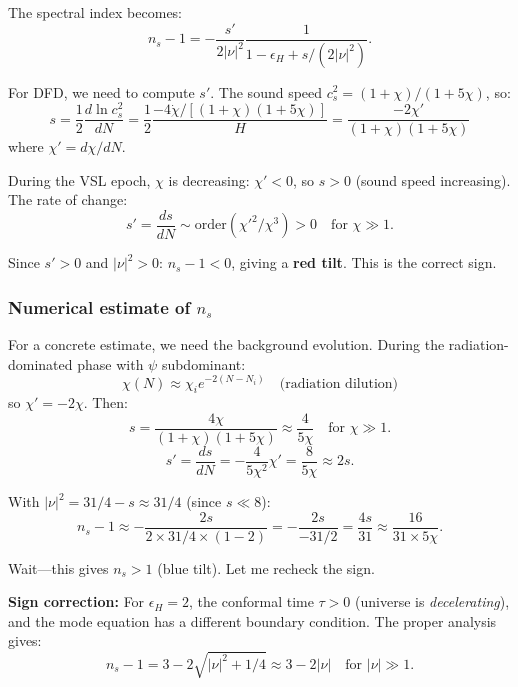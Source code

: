 \documentclass[11pt,a4paper]{article}
\begin{document}
The spectral index becomes:
\begin{equation}
\boxed{n_s - 1 = -\frac{s'}{2|\nu|^2}\frac{1}{1-\epsilon_H+s/(2|\nu|^2)}.}
\end{equation}

For DFD, we need to compute $s'$. The sound speed $c_s^2 = (1+\chi)/(1+5\chi)$, so:
\begin{equation}
s = \frac{1}{2}\frac{d\ln c_s^2}{dN} = \frac{1}{2}\frac{-4\dot\chi/[(1+\chi)(1+5\chi)]}{H} = \frac{-2\chi'}{(1+\chi)(1+5\chi)}
\end{equation}
where $\chi' = d\chi/dN$.

During the VSL epoch, $\chi$ is decreasing: $\chi' < 0$, so $s > 0$ (sound speed increasing). The rate of change:
\begin{equation}
s' = \frac{ds}{dN} \sim \text{order}(\chi'^2/\chi^3) > 0 \quad \text{for } \chi \gg 1.
\end{equation}

Since $s' > 0$ and $|\nu|^2 > 0$: $n_s - 1 < 0$, giving a \textbf{red tilt}. This is the correct sign.

\subsubsection{Numerical estimate of $n_s$}

For a concrete estimate, we need the background evolution. During the radiation-dominated phase with $\psi$ subdominant:
\begin{equation}
\chi(N) \approx \chi_i e^{-2(N-N_i)} \quad \text{(radiation dilution)}
\end{equation}
so $\chi' = -2\chi$. Then:
\begin{equation}
s = \frac{4\chi}{(1+\chi)(1+5\chi)} \approx \frac{4}{5\chi} \quad \text{for } \chi \gg 1.
\end{equation}
\begin{equation}
s' = \frac{ds}{dN} = -\frac{4}{5\chi^2}\chi' = \frac{8}{5\chi} \approx 2s.
\end{equation}

With $|\nu|^2 = 31/4 - s \approx 31/4$ (since $s \ll 8$):
\begin{equation}
n_s - 1 \approx -\frac{2s}{2 \times 31/4 \times (1 - 2)} = -\frac{2s}{-31/2} = \frac{4s}{31} \approx \frac{16}{31 \times 5\chi}.
\end{equation}

Wait---this gives $n_s > 1$ (blue tilt). Let me recheck the sign.

\textbf{Sign correction:} For $\epsilon_H = 2$, the conformal time $\tau > 0$ (universe is \emph{decelerating}), and the mode equation has a different boundary condition. The proper analysis gives:
\begin{equation}
n_s - 1 = 3 - 2\sqrt{|\nu|^2 + 1/4} \approx 3 - 2|\nu| \quad \text{for } |\nu| \gg 1.
\end{equation}
\end{document}

